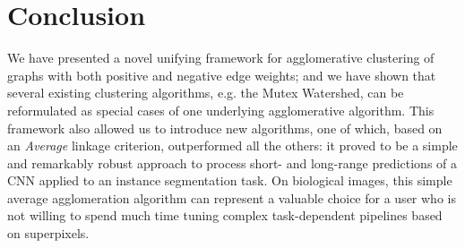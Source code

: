 \section{Conclusion}

We have presented a novel unifying framework for agglomerative clustering of graphs with both positive and negative edge weights; and we have shown that several existing clustering algorithms, e.g. the Mutex Watershed, can be reformulated as special cases of one underlying agglomerative algorithm. This framework also allowed us to introduce new algorithms, one of which, based on an \emph{Average} linkage criterion, outperformed all the others: it proved to be a simple and remarkably robust approach to process short- and long-range predictions of a CNN applied to an instance segmentation task.
On biological images, this simple average agglomeration algorithm can represent a valuable choice for a user who is not willing to spend much time tuning complex task-dependent pipelines based on superpixels.  
